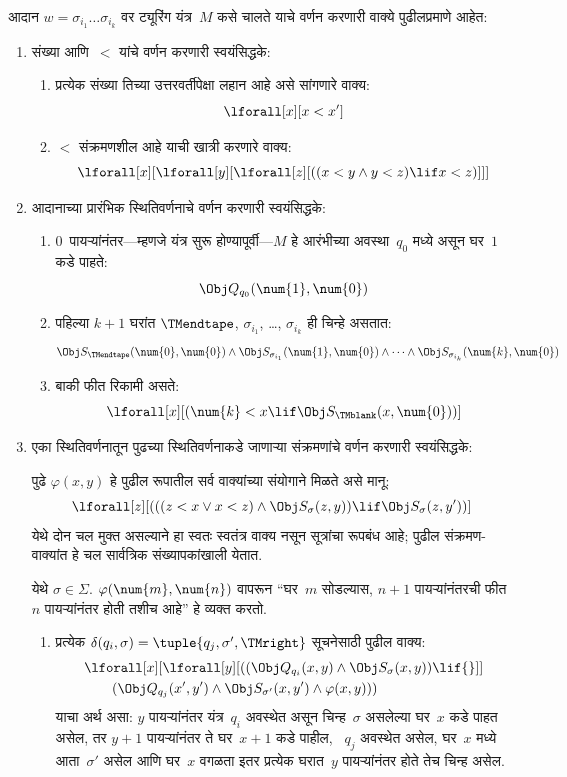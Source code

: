 आदान $w = \sigma_{i_1}\dots\sigma_{i_k}$
वर ट्यूरिंग यंत्र~$M$ कसे चालते याचे
वर्णन करणारी वाक्ये
पुढीलप्रमाणे आहेत:
\begin{enumerate}
\item संख्या आणि~$<$ यांचे वर्णन
करणारी स्वयंसिद्धके:
\begin{enumerate}
\item प्रत्येक संख्या तिच्या उत्तरवर्तीपेक्षा
लहान आहे असे सांगणारे वाक्य:
\[\lforall[x][x < x']
\]
\item $<$ संक्रमणशील आहे याची
खात्री करणारे वाक्य:
\[\lforall[x][\lforall[y][\lforall[z][
      ((x < y \land y < z) \lif x < z)]]]
\]
\end{enumerate}
\item आदानाच्या प्रारंभिक स्थितिवर्णनाचे
वर्णन करणारी स्वयंसिद्धके:
\begin{enumerate}
\item $0$~पायऱ्यांनंतर---म्हणजे
  यंत्र सुरू होण्यापूर्वी---$M$
  हे आरंभीच्या अवस्था~$q_0$
  मध्ये असून घर~$1$ कडे पाहते:
\[\Obj Q_{q_0}(\num{1}, \num{0})
\]
\item पहिल्या $k+1$ घरांत
  $\TMendtape$, $\sigma_{i_1}$,
  \dots, $\sigma_{i_k}$ ही चिन्हे
  असतात:
\[\Obj S_\TMendtape(\num{0}, \num{0}) \land
\Obj S_{\sigma_{i_1}}(\num{1}, \num{0}) \land
\dots \land
\Obj S_{\sigma_{i_k}}(\num{k}, \num{0})
\]
\item बाकी फीत रिकामी असते:
\[\lforall[x][(\num{k} < x \lif \Obj S_\TMblank(x, \num{0}))]
\]
\end{enumerate}
\item एका स्थितिवर्णनातून पुढच्या
स्थितिवर्णनाकडे जाणाऱ्या संक्रमणांचे
वर्णन करणारी स्वयंसिद्धके:

पुढे $\varphi(x, y)$ हे पुढील
रूपातील सर्व वाक्यांच्या
संयोगाने मिळते असे मानू:
\[\lforall[z][
  (((z < x \lor x < z) \land \Obj S_\sigma(z, y))
  \lif \Obj S_\sigma(z, y'))]
\]
येथे दोन चल मुक्त असल्याने हा स्वतः स्वतंत्र वाक्य
नसून सूत्रांचा रूपबंध आहे; पुढील संक्रमण-वाक्यांत
हे चल सार्वत्रिक संख्यापकांखाली येतात.

येथे $\sigma \in \Sigma$.
$\varphi(\num{m},\num{n})$ वापरून
“घर~$m$ सोडल्यास, $n+1$
पायऱ्यांनंतरची फीत $n$
पायऱ्यांनंतर होती तशीच आहे”
हे व्यक्त करतो.
\begin{enumerate}
\item \label{tur:und:rep:rep-right} प्रत्येक
  $\delta(q_i, \sigma) =
  \tuple{q_j, \sigma', \TMright}$
  सूचनेसाठी पुढील वाक्य:
\begin{align*}
& \lforall[x][\lforall[y][(
   (\Obj Q_{q_i}(x, y) \land \Obj S_{\sigma}(x, y)) \lif {}]] \\
&\qquad   (\Obj Q_{q_j}(x', y') \land \Obj S_{\sigma'}(x, y') \land
\varphi(x, y)))
\end{align*}
याचा अर्थ असा: $y$ पायऱ्यांनंतर
यंत्र~$q_i$ अवस्थेत असून
चिन्ह~$\sigma$ असलेल्या
घर~$x$ कडे पाहत असेल,
तर $y+1$ पायऱ्यांनंतर
ते घर~$x+1$ कडे पाहील,
~$q_j$ अवस्थेत असेल,
घर~$x$ मध्ये आता~$\sigma'$
असेल आणि घर~$x$ वगळता
इतर प्रत्येक घरात~$y$
पायऱ्यांनंतर होते तेच
चिन्ह असेल.


\end{enumerate}
\end{enumerate}
